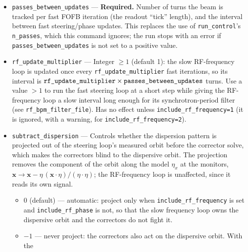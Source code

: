\documentclass[11pt]{article}
\begin{document}
\begin{itemize}
  oscillation.  When zero, an analytic estimate
  $-(180/\pi)\,\gamma_0/(\verb|passes_between_updates|\cdot \hat{V}\cos\phi_s)$, with $\hat{V}$
  the per-turn RF voltage scaled to energy-kick units and $\phi_s$ the synchronous phase, is
  used and a warning is printed noting that the estimate's sign is heuristic and should be
  calibrated.  A warning is also printed if \verb|passes_between_updates| is large compared with
  the synchrotron period, since a held phase offset then loses damping efficacy as the beam
  re-phases (use a faster loop, i.e. a smaller \verb|passes_between_updates|).
\item \verb|passes_between_updates| --- \textbf{Required.}  Number of turns the beam is tracked
  per fast FOFB iteration (the readout ``tick'' length), and the interval between fast
  steering/phase updates.  This replaces the use of \verb|run_control|'s \verb|n_passes|, which
  this command ignores; the run stops with an error if \verb|passes_between_updates| is not set
  to a positive value.
\item \verb|rf_update_multiplier| --- Integer $\ge 1$ (default 1): the slow RF-frequency loop is
  updated once every \verb|rf_update_multiplier| fast iterations, so its interval is
  $\verb|rf_update_multiplier|\times\verb|passes_between_updates|$ turns.  Use a value $>1$ to
  run the fast steering loop at a short step while giving the RF-frequency loop a slow interval
  long enough for its synchrotron-period filter (see \verb|rf_bpm_filter_file|).  Has no effect
  unless \verb|include_rf_frequency=1| (it is ignored, with a warning, for
  \verb|include_rf_frequency=2|).
\item \verb|subtract_dispersion| --- Controls whether the dispersion pattern is projected out
  of the steering loop's measured orbit before the corrector solve, which makes the correctors
  blind to the dispersive orbit.  The projection removes the component of the orbit along the
  model $\eta_x$ at the monitors, $\mathbf{x} \rightarrow \mathbf{x} - \eta\,(\mathbf{x}\cdot\eta)/
  (\eta\cdot\eta)$; the RF-frequency loop is unaffected, since it reads its own signal.
  \begin{itemize}
  \item $0$ (default) --- automatic: project only when \verb|include_rf_frequency| is set and
    \verb|include_rf_phase| is not, so that the slow frequency loop owns the dispersive orbit
    and the correctors do not fight it.
  \item $-1$ --- never project: the correctors also act on the dispersive orbit.  With the

\end{itemize}
\end{itemize}
\end{document}
